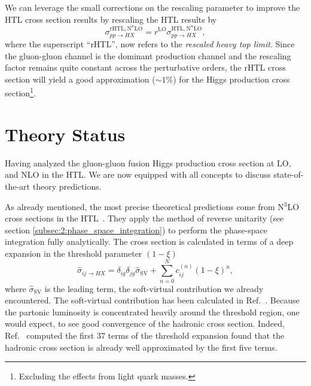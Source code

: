 We can leverage the small corrections on the rescaling parameter to improve the \acs{HTL} cross section results by rescaling the \acs{HTL} results by
\begin{equation}
\sigma_{pp \rightarrow HX}^{\mathrm{rHTL}, \mathrm{N}^n\mathrm{LO}} = r^{\mathrm{LO}} \sigma_{pp \rightarrow HX}^{\mathrm{HTL}, \mathrm{N}^n\mathrm{LO}},
\end{equation}
where the superscript ``\acs{rHTL}'', now refers to the \textit{rescaled heavy top limit}. Since the gluon-gluon channel is the dominant production channel and the rescaling factor remains quite constant across the perturbative orders, the \acs{rHTL} cross section will yield a good approximation ($\sim 1 \%$) for the Higgs production cross section\footnote{Excluding the effects from light quark masses.}.




\section{Theory Status}
Having analyzed the gluon-gluon fusion Higgs production cross section at \acs{LO}, and \acs{NLO} in the \acs{HTL}. We are now equipped with all concepts to discuss state-of-the-art theory predictions.

As already mentioned, the most precise theoretical predictions come from N${}^3$LO cross sections in the \acs{HTL}~\cite{Anastasiou:2015vya, Anastasiou:2016cez}. They apply the method of reverse unitarity (see section \ref{subsec:2:phase_space_integration}) to perform the phase-space integration fully analytically. The cross section is calculated in terms of a deep expansion in the threshold parameter $(1 - \xi)$
\begin{equation}
\hat{\sigma}_{ij \rightarrow HX} = \delta_{ig} \delta_{jg} \hat{\sigma}_{\mathrm{SV}} + \sum_{n = 0}^N c_{ij}^{(n)} (1 - \xi)^n,
\label{eq:4:threshold_expansion}
\end{equation}
where $\hat{\sigma}_{\mathrm{SV}}$ is the leading term, the soft-virtual contribution we already encountered. The soft-virtual contribution has been calculated in Ref.~\cite{Anastasiou:2014vaa}. Because the partonic luminosity is concentrated heavily around the threshold region, one would expect, to see good convergence of the hadronic cross section. Indeed, Ref.~\cite{Anastasiou:2015vya} computed the first 37 terms of the threshold expansion found that the hadronic cross section is already well approximated by the first five terms.

